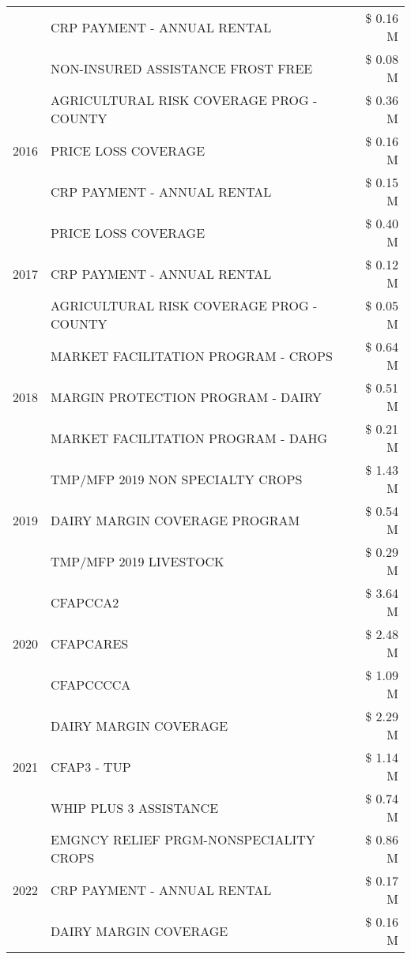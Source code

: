 \begin{tabular}{llr}
 & CRP PAYMENT - ANNUAL RENTAL & \$ 0.16 M \\
 & NON-INSURED ASSISTANCE FROST FREE & \$ 0.08 M \\
\cline{1-3}
\multirow[t]{3}{*}{2016} & AGRICULTURAL RISK COVERAGE PROG - COUNTY & \$ 0.36 M \\
 & PRICE LOSS COVERAGE & \$ 0.16 M \\
 & CRP PAYMENT - ANNUAL RENTAL & \$ 0.15 M \\
\cline{1-3}
\multirow[t]{3}{*}{2017} & PRICE LOSS COVERAGE & \$ 0.40 M \\
 & CRP PAYMENT - ANNUAL RENTAL & \$ 0.12 M \\
 & AGRICULTURAL RISK COVERAGE PROG - COUNTY & \$ 0.05 M \\
\cline{1-3}
\multirow[t]{3}{*}{2018} & MARKET FACILITATION PROGRAM - CROPS & \$ 0.64 M \\
 & MARGIN PROTECTION PROGRAM - DAIRY & \$ 0.51 M \\
 & MARKET FACILITATION PROGRAM - DAHG & \$ 0.21 M \\
\cline{1-3}
\multirow[t]{3}{*}{2019} & TMP/MFP 2019 NON SPECIALTY CROPS & \$ 1.43 M \\
 & DAIRY MARGIN COVERAGE PROGRAM & \$ 0.54 M \\
 & TMP/MFP 2019 LIVESTOCK & \$ 0.29 M \\
\cline{1-3}
\multirow[t]{3}{*}{2020} & CFAPCCA2 & \$ 3.64 M \\
 & CFAPCARES & \$ 2.48 M \\
 & CFAPCCCCA & \$ 1.09 M \\
\cline{1-3}
\multirow[t]{3}{*}{2021} & DAIRY MARGIN COVERAGE & \$ 2.29 M \\
 & CFAP3 - TUP & \$ 1.14 M \\
 & WHIP PLUS 3 ASSISTANCE & \$ 0.74 M \\
\cline{1-3}
\multirow[t]{3}{*}{2022} & EMGNCY RELIEF PRGM-NONSPECIALITY CROPS & \$ 0.86 M \\
 & CRP PAYMENT - ANNUAL RENTAL & \$ 0.17 M \\
 & DAIRY MARGIN COVERAGE & \$ 0.16 M \\
\cline{1-3}
\bottomrule
\end{tabular}
